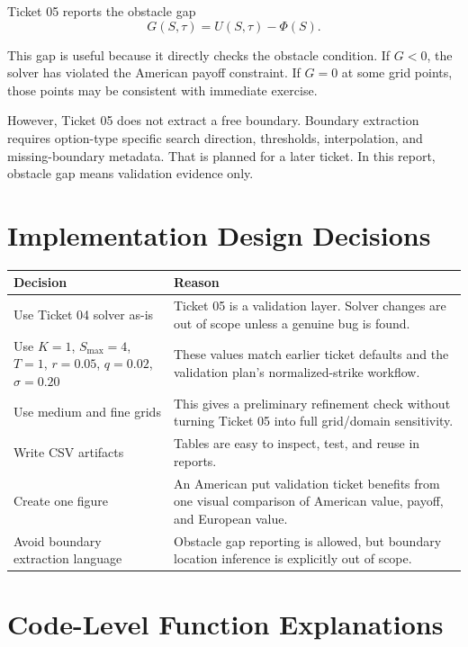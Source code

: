 \documentclass[11pt,a4paper]{article}
\begin{document}
Ticket 05 reports the obstacle gap
\begin{equation}
  G(S,\tau)=U(S,\tau)-\Phi(S).
\end{equation}

This gap is useful because it directly checks the obstacle condition. If \(G<0\), the solver has
violated the American payoff constraint. If \(G=0\) at some grid points, those points may be
consistent with immediate exercise.

However, Ticket 05 does not extract a free boundary. Boundary extraction requires option-type
specific search direction, thresholds, interpolation, and missing-boundary metadata. That is
planned for a later ticket. In this report, obstacle gap means validation evidence only.

\section{Implementation Design Decisions}

\begin{longtable}{L{0.28\textwidth}L{0.60\textwidth}}
\toprule
Decision & Reason \\
\midrule
\endhead
Use Ticket 04 solver as-is &
Ticket 05 is a validation layer. Solver changes are out of scope unless a genuine bug is found. \\
Use \(K=1\), \(S_{\max}=4\), \(T=1\), \(r=0.05\), \(q=0.02\), \(\sigma=0.20\) &
These values match earlier ticket defaults and the validation plan's normalized-strike workflow. \\
Use medium and fine grids &
This gives a preliminary refinement check without turning Ticket 05 into full grid/domain
sensitivity. \\
Write CSV artifacts &
Tables are easy to inspect, test, and reuse in reports. \\
Create one figure &
An American put validation ticket benefits from one visual comparison of American value, payoff,
and European value. \\
Avoid boundary extraction language &
Obstacle gap reporting is allowed, but boundary location inference is explicitly out of scope. \\
\bottomrule
\end{longtable}

\section{Code-Level Function Explanations}
\end{document}
